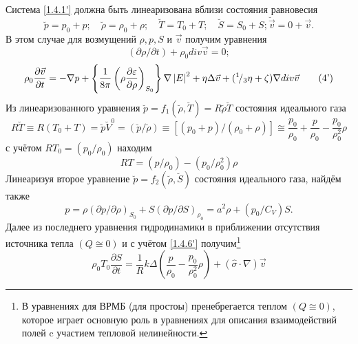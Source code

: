 \documentclass[a4paper]{article}
\begin{document}
Система \eqref{1.4.1'} должна быть линеаризована вблизи состояния равновесия 
\begin{equation}
	\breve{p}=p_{0}+p;\quad\breve{\rho}=\rho_{0}+\rho;\quad\breve{T}=T_{0}+T;\quad\breve{S}=S_{0}+S;\breve{\vec{v}}=0+\vec{v}.
	\tag{2'}
	\label{1.4.2'}
\end{equation}
\newpage
В этом случае для возмущений $\rho,p,S$ и $\vec{v}$  получим уравнения 
\begin{equation}
	(\partial\rho/\partial t)+\rho_{0}div\vec{v}=0;\label{1.4.3'}\tag{3'}
\end{equation}
\begin{equation}	
	\rho_{0}\frac{\partial\vec{v}}{\partial t}=-\nabla p+\left\{\frac{1}{8\pi}\left(\rho\frac{\partial\varepsilon}{\partial\rho}\right)_{S_{0}}\right\}\nabla\left|E\right|^{2}+\eta\Delta\vec{v}+({}^{1}\!/_{3}\eta+\zeta)\nabla div\vec{v}\tag{4'}\label{1.4.4'}
\end{equation}
Из линеаризованного уравнения $\breve{p}=f_{1}(\breve{\rho},\breve{T})=R\breve{\rho}\breve{T}$  состояния идеального газа 
\begin{equation}
	R\breve{T}\equiv R(T_{0}+T)=\breve{p}\breve{V}^{0}=(\breve{p}/\breve{\rho})\equiv[(p_{0}+p)/(\rho_{0}+\rho)]\cong\frac{p_{0}}{\rho_{0}}+\frac{p}{\rho_{0}}-\frac{p_{0}}{\rho_{0}^{2}}\rho\tag{5'}\label{1.4.5'}
\end{equation}
с учётом $RT_{0}=(p_{0}/\rho_{0})$ находим 
\begin{equation}
	RT=(p/\rho_{0})-(p_{0}/\rho_{0}^{2})\rho
	\tag{5''}\label{1.4.5''}
\end{equation}
Линеаризуя второе уравнение $\breve{p}=f_{2}(\breve{\rho},\breve{S})$  состояния идеального газа, найдём также
\begin{equation}
	p=\rho(\partial p/\partial\rho)_{S_{0}}+S(\partial p/\partial S)_{\rho_{0}}=a^{2}\rho+(p_{0}/C_{V})S.\tag{6'}\label{1.4.6'}
\end{equation}
\setcounter{footnote}{0}
Далее из последнего уравнения гидродинамики в приближении отсутствия источника тепла $(Q\cong0)$ и с учётом \eqref{1.4.6'} получим\footnote{В уравнениях для ВРМБ (для простоы) пренебрегается теплом $(Q\cong0)$, которое играет основную роль в уравнениях для описания взаимодействий полей c участием тепловой нелинейности.}
\begin{equation}
	\rho_{0}T_{0}\frac{\partial S}{\partial t}=\frac{1}{R}k\Delta\left(\frac{p}{\rho_{0}}-\frac{p_{0}}{\rho_{0}^{2}}\rho\right)+(\hat{\sigma}\cdot\nabla)\vec{v}
	\tag{7'}\label{1.4.7'}
\end{equation} 
\end{document}
